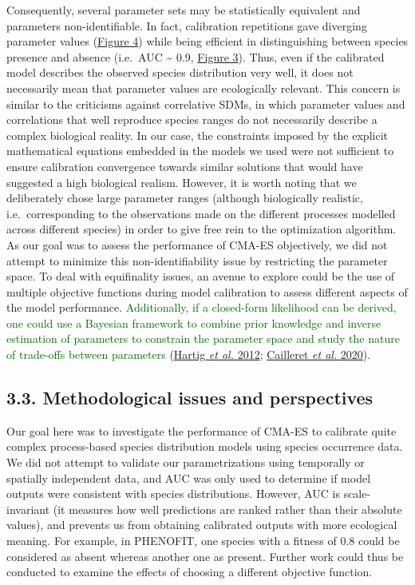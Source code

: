 \documentclass[11pt,]{article}
\begin{document}
Consequently, several parameter sets may be statistically equivalent and
parameters non-identifiable. In fact, calibration repetitions gave
diverging parameter values (\hyperref[fig:unfoldingplots]{Figure 4})
while being efficient in distinguishing between species presence and
absence (i.e.~AUC \textasciitilde{} 0.9,
\hyperref[fig:cmaesrepAUCcal]{Figure 3}). Thus, even if the calibrated
model describes the observed species distribution very well, it does not
necessarily mean that parameter values are ecologically relevant. This
concern is similar to the criticisms against correlative SDMs, in which
parameter values and correlations that well reproduce species ranges do
not necessarily describe a complex biological reality. In our case, the
constraints imposed by the explicit mathematical equations embedded in
the models we used were not sufficient to ensure calibration convergence
towards similar solutions that would have suggested a high biological
realism. However, it is worth noting that we deliberately chose large
parameter ranges (although biologically realistic, i.e.~corresponding to
the observations made on the different processes modelled across
different species) in order to give free rein to the optimization
algorithm. As our goal was to assess the performance of CMA-ES
objectively, we did not attempt to minimize this non-identifiability
issue by restricting the parameter space. To deal with equifinality
issues, an avenue to explore could be the use of multiple objective
functions during model calibration to assess different aspects of the
model performance.
\textcolor{darkgreen}{Additionally, if a closed-form likelihood can be derived, one could use a Bayesian framework to combine prior knowledge and inverse estimation of parameters to constrain the parameter space and study the nature of trade-offs between parameters}
(\protect\hyperlink{ref-Hartig2012}{Hartig \emph{et al.} 2012};
\protect\hyperlink{ref-Cailleret2020}{Cailleret \emph{et al.} 2020}).

\hypertarget{methodological-issues-and-perspectives}{%
\subsection{3.3. Methodological issues and
perspectives}\label{methodological-issues-and-perspectives}}

Our goal here was to investigate the performance of CMA-ES to calibrate
quite complex process-based species distribution models using species
occurrence data. We did not attempt to validate our parametrizations
using temporally or spatially independent data, and AUC was only used to
determine if model outputs were consistent with species distributions.
However, AUC is scale-invariant (it measures how well predictions are
ranked rather than their absolute values), and prevents us from
obtaining calibrated outputs with more ecological meaning. For example,
in PHENOFIT, one species with a fitness of \(0.8\) could be considered
as absent whereas another one as present. Further work could thus be
conducted to examine the effects of choosing a different objective
function.
\end{document}
